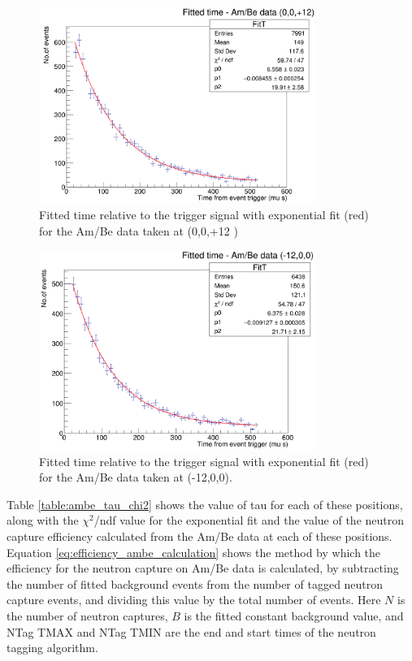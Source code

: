 \begin{figure}
    \centering
    \includegraphics[width=0.8\textwidth]{Figures/ambe_data_+12z.png}
    \caption{Fitted time relative to the trigger signal with exponential fit (red) for the Am/Be data taken at (0,0,+12 )}
    \label{fig:ambe_+12z}
\end{figure}

\begin{figure}
    \centering
    \includegraphics[width=0.8\textwidth]{Figures/ambe_data_-12x.png}
    \caption{Fitted time relative to the trigger signal with exponential fit (red) for the Am/Be data taken at (-12,0,0).}
    \label{fig:ambe_-12}
\end{figure}

Table \ref{table:ambe_tau_chi2} shows the value of tau for each of these positions, along with the $\chi^{2}$/ndf value for the exponential fit and the value of the neutron capture efficiency calculated from the Am/Be data at each of these positions. Equation \ref{eq:efficiency_ambe_calculation} shows the method by which the efficiency for the neutron capture on Am/Be data is calculated, by subtracting the number of fitted background events from the number of tagged neutron capture events, and dividing this value by the total number of events. Here $N$ is the number of neutron captures, $B$ is the fitted constant background value, and NTag TMAX and NTag TMIN are the end and start times of the neutron tagging algorithm.   





